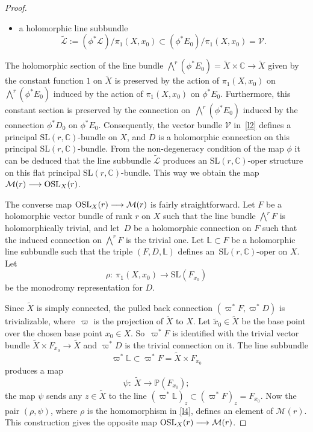 \documentclass[pdftex]{sigma}
\numberwithin{equation}{section}
\begin{document}
\begin{proof}
\begin{itemize}
\item a holomorphic line subbundle
\[%
\widetilde{\mathcal L} := (\phi^*{\mathcal L})/\pi_1(X, x_0) \subset
(\phi^*E_0)/\pi_1(X, x_0) = {\mathcal V}.
\]
\end{itemize}
The holomorphic section of the line bundle
$\bigwedge^r (\phi^*E_0) = \widetilde{X}\times{\mathbb C} \longrightarrow
\widetilde{X}$ given by the constant function $1$ on $\widetilde{X}$ is preserved
by the action of $\pi_1(X, x_0)$ on $\bigwedge^r (\phi^*E_0)$ induced by the action of
$\pi_1(X, x_0)$ on $\phi^*E_0$. Furthermore, this constant section is preserved by the
connection on~$\bigwedge^r (\phi^*E_0)$ induced by the connection
$\phi^* D_0$ on $\phi^*E_0$. Consequently, the vector bundle ${\mathcal V}$ in~\eqref{l2} defines a
principal $\text{SL}(r, {\mathbb C})$-bundle on $X$, and $D$ is
a holomorphic connection on this principal $\text{SL}(r, {\mathbb C})$-bundle. From the
non-degeneracy condition of the map $\phi$ it can be deduced that the
line subbundle $\widetilde{\mathcal L}$ produces an $\text{SL}(r, {\mathbb C})$-oper
structure on this flat principal $\text{SL}(r, {\mathbb C})$-bundle. This way we obtain the
map ${\mathcal M}(r) \longrightarrow {\rm OSL}_X(r)$.

{\samepage The converse map ${\rm OSL}_X(r) \longrightarrow {\mathcal M}(r)$ is
fairly straightforward. Let $F$ be a holomorphic vector bundle of rank $r$ on $X$
such that the line bundle $\bigwedge^r F$ is holomorphically trivial, and let~$D$ be
a holomorphic connection on $F$ such that the induced connection on $\bigwedge^r F$
is the trivial one. Let ${\mathbb L} \subset F$ be a holomorphic line subbundle
such that the triple $(F, D, {\mathbb L})$ defines an~$\text{SL}(r, {\mathbb C})$-oper
on $X$. Let
\begin{equation}\label{l4}
\rho\colon\ \pi_1(X, x_0) \longrightarrow \text{SL}(F_{x_0})
\end{equation}
be the monodromy representation for $D$.}

Since $\widetilde X$ is simply connected, the pulled back connection
$(\varpi^*F, \varpi^*D)$ is trivializable, where~$\varpi$ is the projection of
$\widetilde X$ to $X$. Let $\widetilde{x}_0 \in \widetilde X$ be the base point
over the chosen base point $x_0 \in X$. So~$\varpi^*F$ is identified with the
trivial vector bundle ${\widetilde X}\times F_{x_0} \longrightarrow {\widetilde X}$
and $\varpi^*D$ is the trivial connection on it. The line subbundle
\[
\varpi^* {\mathbb L} \subset \varpi^* F = {\widetilde X}\times F_{x_0}
\]
produces a map
\[
\psi\colon\ {\widetilde X} \longrightarrow {\mathbb P}(F_{x_0});
\]
the map $\psi$ sends any $z \in {\widetilde X}$ to the line
$(\varpi^* {\mathbb L})_z \subset (\varpi^* F)_z = F_{x_0}$. Now the
pair $(\rho, \psi)$, where $\rho$ is the homomorphism in \eqref{l4}, defines an element of ${\mathcal M}(r)$.
This construction gives the opposite map ${\rm OSL}_X(r) \longrightarrow {\mathcal M}(r)$.


\end{proof}
\end{document}
